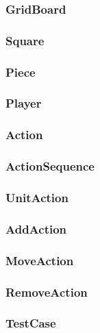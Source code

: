 \subsubsection{GridBoard}

\subsubsection{Square}

\subsubsection{Piece}

\subsubsection{Player}

\subsubsection{Action}

\subsubsection{ActionSequence}

\subsubsection{UnitAction}

\subsubsection{AddAction}

\subsubsection{MoveAction}

\subsubsection{RemoveAction}

\subsubsection{TestCase}
